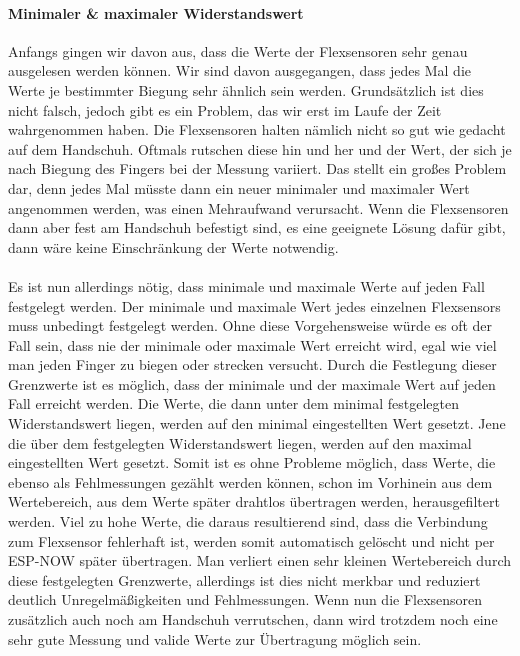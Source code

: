 \documentclass[titlepage,12pt,twoside]{article}
\begin{document}
\paragraph{Minimaler \& maximaler Widerstandswert}
\hfill \break
\hfill \break
Anfangs gingen wir davon aus, dass die Werte der Flexsensoren sehr genau ausgelesen werden können. Wir sind davon ausgegangen, 
dass jedes Mal die Werte je bestimmter Biegung sehr ähnlich sein werden. Grundsätzlich ist dies nicht falsch, jedoch gibt es 
ein Problem, das wir erst im Laufe der Zeit wahrgenommen haben. Die Flexsensoren halten nämlich nicht so gut wie gedacht auf 
dem Handschuh. Oftmals rutschen diese hin und her und der Wert, der sich je nach Biegung des Fingers bei der Messung variiert. 
Das stellt ein großes Problem dar, denn jedes Mal müsste dann ein neuer minimaler und maximaler Wert angenommen werden, was 
einen Mehraufwand verursacht. Wenn die Flexsensoren dann aber fest am Handschuh befestigt sind, es eine geeignete Lösung dafür 
gibt, dann wäre keine Einschränkung der Werte notwendig. \\
\\
Es ist nun allerdings nötig, dass minimale und maximale Werte auf jeden Fall festgelegt werden. Der minimale und maximale Wert 
jedes einzelnen Flexsensors muss unbedingt festgelegt werden. Ohne diese Vorgehensweise würde es oft der Fall sein, dass nie 
der minimale oder maximale Wert erreicht wird, egal wie viel man jeden Finger zu biegen oder strecken versucht. Durch die 
Festlegung dieser Grenzwerte ist es möglich, dass der minimale und der maximale Wert auf jeden Fall erreicht werden. Die Werte, 
die dann unter dem minimal festgelegten Widerstandswert liegen, werden auf den minimal eingestellten Wert gesetzt. Jene die 
über dem festgelegten Widerstandswert liegen, werden auf den maximal eingestellten Wert gesetzt. Somit ist es ohne Probleme 
möglich, dass Werte, die ebenso als Fehlmessungen gezählt werden können, schon im Vorhinein aus dem Wertebereich, aus dem Werte 
später drahtlos übertragen werden, herausgefiltert werden. Viel zu hohe Werte, die daraus resultierend sind, dass die Verbindung 
zum Flexsensor fehlerhaft ist, werden somit automatisch gelöscht und nicht per ESP-NOW später übertragen. Man verliert einen 
sehr kleinen Wertebereich durch diese festgelegten Grenzwerte, allerdings ist dies nicht merkbar und reduziert deutlich 
Unregelmäßigkeiten und Fehlmessungen. Wenn nun die Flexsensoren zusätzlich auch noch am Handschuh verrutschen, dann wird 
trotzdem noch eine sehr gute Messung und valide Werte zur Übertragung möglich sein. \\
\\
\end{document}
